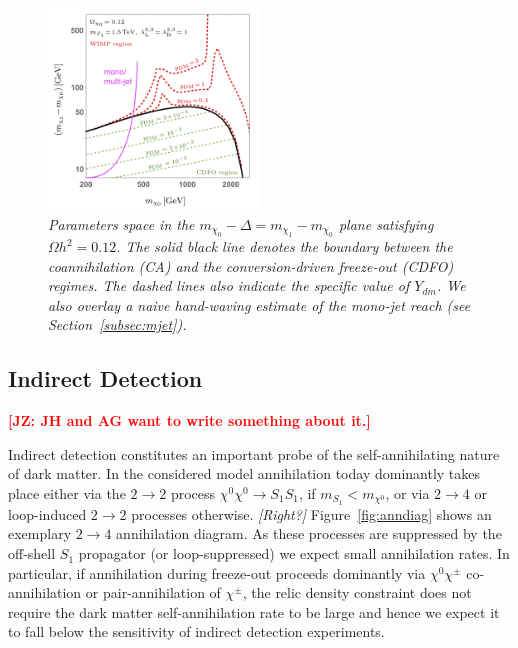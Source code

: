 \documentclass[11pt]{cernrep}
\def\JZ#1{{\bf  \textcolor{red}{[JZ: {#1}]}}}
\newcommand{\com}[1]{\emph{\color{red}[#1]}}  	%
\begin{document}
 \begin{figure}[!htp]
  \centering
  \includegraphics[width=0.5\textwidth]{./figures/CDFO_WIMP_region_toyMJ_v1.png} 
  \caption{\it Parameters space in the $m_{\chi_0} - \Delta = m_{\chi_1} - m_{\chi_0}$ plane satisfying $\Omega h^2 = 0.12$. The solid black line denotes the boundary between the coannihilation (CA) and the conversion-driven freeze-out (CDFO) regimes. The dashed lines also indicate the specific value of $Y_{dm}$. We also overlay a naive hand-waving estimate of the mono-jet reach (see Section~\ref{subsec:mjet}).}
\label{fig:CDFO_WIMP}
\end{figure}



\subsection{Indirect Detection}

\JZ{JH and AG want to write something about it.}

Indirect detection constitutes an important probe of the self-annihilating nature of dark matter. 
In the considered model annihilation today dominantly takes place either via the $2\to2$ process 
$\chi^0 \chi^0 \to S_1 S_1$, if $m_{S_1}< m_{\chi^0}$, or 
via $2\to 4$ or loop-induced $2\to2$ processes otherwise. \com{Right?} 
Figure~\ref{fig:anndiag} shows an exemplary $2\to 4$ annihilation 
diagram. As these processes are suppressed by the off-shell $S_1$ propagator (or loop-suppressed)
we expect small annihilation rates.
In particular, if annihilation during freeze-out proceeds dominantly via $\chi^0 \chi^\pm$ co-annihilation or 
pair-annihilation of $\chi^\pm$, the relic density constraint does not require the dark matter self-annihilation 
rate to be large and hence we expect it to fall below the sensitivity of indirect detection experiments.
\end{document}
